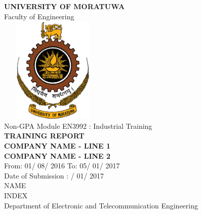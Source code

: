 \documentclass[12pt,a4paper,margin=1in]{article}
\begin{document}
\begin{titlepage}


\center %

\fontsize{16pt}{12}\selectfont \textbf{UNIVERSITY OF MORATUWA}\\[0.5cm] %
\fontsize{16pt}{12}\selectfont Faculty of Engineering\\[0.5cm] %

\includegraphics[width=2in,height=2in,keepaspectratio]{logo.png}\\[1cm] %


\fontsize{16pt}{12}\selectfont Non-GPA Module EN3992 : Industrial Training\\[0.5cm]
\fontsize{16pt}{12}\selectfont \textbf{TRAINING REPORT}\\[1.5cm]
\fontsize{16pt}{12}\selectfont \textbf{COMPANY NAME - LINE 1}\\[4pt] 
\fontsize{16pt}{12}\selectfont \textbf{COMPANY NAME - LINE 2}\\[0.5cm]
\fontsize{16pt}{12}\selectfont From: 01/ 08/ 2016 To: 05/ 01/ 2017\\[2cm]

\fontsize{16pt}{12}\selectfont Date of Submission : {\fontsize{16pt}{12}/ 01/ 2017}\\[1cm]

\fontsize{16pt}{12}\selectfont NAME\\[0.5cm]
\fontsize{16pt}{12}\selectfont INDEX\\[1cm]

\fontsize{16pt}{12}\selectfont Department of Electronic and Telecommunication Engineering\\[1cm]


\vfill %

\end{titlepage}
\end{document}
